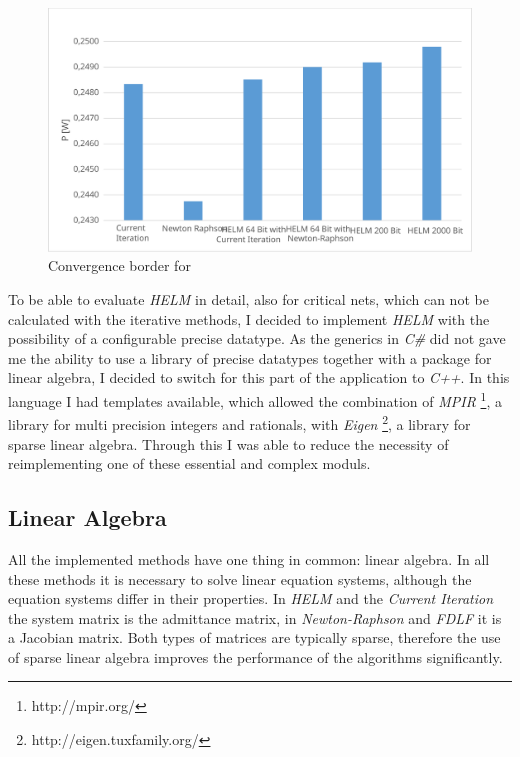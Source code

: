 \begin{figure}
	\centering
	\includegraphics[scale=0.7]{figures/convergence_border}
	\caption{Convergence border for }
	\label{fig:convergence_border}
\end{figure}

To be able to evaluate \emph{HELM} in detail, also for critical nets, which can not be calculated with the iterative methods, I decided to implement \emph{HELM} with the possibility of a configurable precise datatype. As the generics in \emph{C\#} did not gave me the ability to use a library of precise datatypes together with a package for linear algebra, I decided to switch for this part of the application to \emph{C++}. In this language I had templates available, which allowed the combination of \emph{MPIR} \footnote{http://mpir.org/}, a library for multi precision integers and rationals, with \emph{Eigen} \footnote{http://eigen.tuxfamily.org/}, a library for sparse linear algebra. Through this I was able to reduce the necessity of reimplementing one of these essential and complex moduls.

\subsection{Linear Algebra}
All the implemented methods have one thing in common: linear algebra. In all these methods it is necessary to solve linear equation systems, although the equation systems differ in their properties. In \emph{HELM} and the \emph{Current Iteration} the system matrix is the admittance matrix, in \emph{Newton-Raphson} and \emph{FDLF} it is a Jacobian matrix. Both types of matrices are typically sparse, therefore the use of sparse linear algebra improves the performance of the algorithms significantly.

